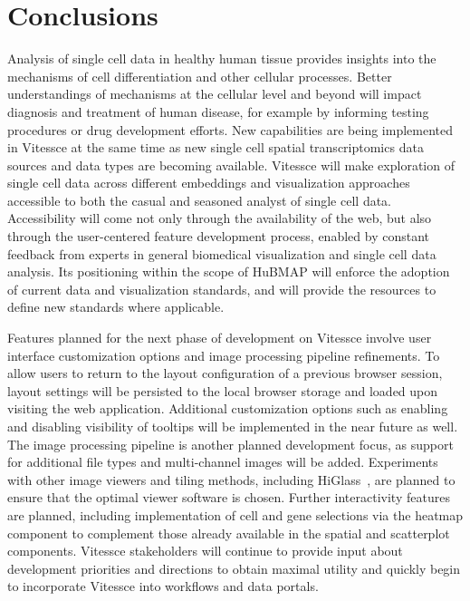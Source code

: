 \documentclass[12pt, letterpaper]{article}
\begin{document}
\section{Conclusions}
Analysis of single cell data in healthy human tissue provides insights into the mechanisms of cell differentiation and other cellular processes.
Better understandings of mechanisms at the cellular level and beyond will impact diagnosis and treatment of human disease, for example by informing testing procedures or drug development efforts.
New capabilities are being implemented in Vitessce at the same time as new single cell spatial transcriptomics data sources and data types are becoming available.
Vitessce will make exploration of single cell data across different embeddings and visualization approaches accessible to both the casual and seasoned analyst of single cell data.
Accessibility will come not only through the availability of the web, but also through the user-centered feature development process, enabled by constant feedback from experts in general biomedical visualization and single cell data analysis.
Its positioning within the scope of HuBMAP will enforce the adoption of current data and visualization standards, and will provide the resources to define new standards where applicable.

Features planned for the next phase of development on Vitessce involve user interface customization options and image processing pipeline refinements.
To allow users to return to the layout configuration of a previous browser session, layout settings will be persisted to the local browser storage and loaded upon visiting the web application.
Additional customization options such as enabling and disabling visibility of tooltips will be implemented in the near future as well.
The image processing pipeline is another planned development focus, as support for additional file types and multi-channel images will be added.
Experiments with other image viewers and tiling methods, including HiGlass~\cite{kerpedjiev2018higlass}, are planned to ensure that the optimal viewer software is chosen.
Further interactivity features are planned, including implementation of cell and gene selections via the heatmap component to complement those already available in the spatial and scatterplot components.
Vitessce stakeholders will continue to provide input about development priorities and directions to obtain maximal utility and quickly begin to incorporate Vitessce into workflows and data portals.
\end{document}
